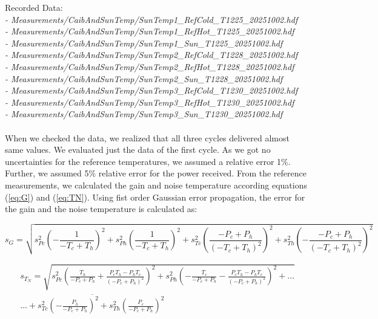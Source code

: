 Recorded Data: \\
\textit{
- Measurements/CaibAndSunTemp/SunTemp1\_RefCold\_T1225\_20251002.hdf \\
- Measurements/CaibAndSunTemp/SunTemp1\_RefHot\_T1225\_20251002.hdf \\
- Measurements/CaibAndSunTemp/SunTemp1\_Sun\_T1225\_20251002.hdf \\
- Measurements/CaibAndSunTemp/SunTemp2\_RefCold\_T1228\_20251002.hdf \\
- Measurements/CaibAndSunTemp/SunTemp2\_RefHot\_T1228\_20251002.hdf  \\
- Measurements/CaibAndSunTemp/SunTemp2\_Sun\_T1228\_20251002.hdf \\
- Measurements/CaibAndSunTemp/SunTemp3\_RefCold\_T1230\_20251002.hdf \\
- Measurements/CaibAndSunTemp/SunTemp3\_RefHot\_T1230\_20251002.hdf \\
- Measurements/CaibAndSunTemp/SunTemp3\_Sun\_T1230\_20251002.hdf } \\
 \\
When we checked the data, we realized that all three cycles delivered almost same values. We evaluated just the data of the first cycle. As we got no uncertainties for the reference temperatures, we assumed a relative error 1\%. Further, we assumed 5\% relative error for the power received. From the reference measurements, we calculated the gain and noise temperature according equations (\ref{eq:G}) and (\ref{eq:TN}). Using fist order Gaussian error propagation, the error for the gain and the noise temperature is calculated as:

\begin{equation}
	s_{G} = \sqrt{s_{P c}^{2} \left(- \frac{1}{- T_{c} + T_{h}}\right)^{2} + s_{P h}^{2} \left(\frac{1}{- T_{c} + T_{h}}\right)^{2} + s_{T c}^{2} \left(\frac{- P_{c} + P_{h}}{\left(- T_{c} + T_{h}\right)^{2}}\right)^{2} + s_{T h}^{2} \left(- \frac{- P_{c} + P_{h}}{\left(- T_{c} + T_{h}\right)^{2}}\right)^{2}}
\end{equation}

\begin{equation}
	\begin{split}
	s_{T_N} = \sqrt{s_{P c}^{2} \left(\frac{T_{h}}{- P_{c} + P_{h}} + \frac{P_{c} T_{h} - P_{h} T_{c}}{\left(- P_{c} + P_{h}\right)^{2}}\right)^{2} + s_{P h}^{2} \left(- \frac{T_{c}}{- P_{c} + P_{h}} - \frac{P_{c} T_{h} - P_{h} T_{c}}{\left(- P_{c} + P_{h}\right)^{2}}\right)^{2} + \hdots } \\
	\overline{\hdots + s_{T c}^{2} \left(- \frac{P_{h}}{- P_{c} + P_{h}}\right)^{2} + s_{T h}^{2} \left(\frac{P_{c}}{- P_{c} + P_{h}}\right)^{2}}
	\end{split}
\end{equation}

